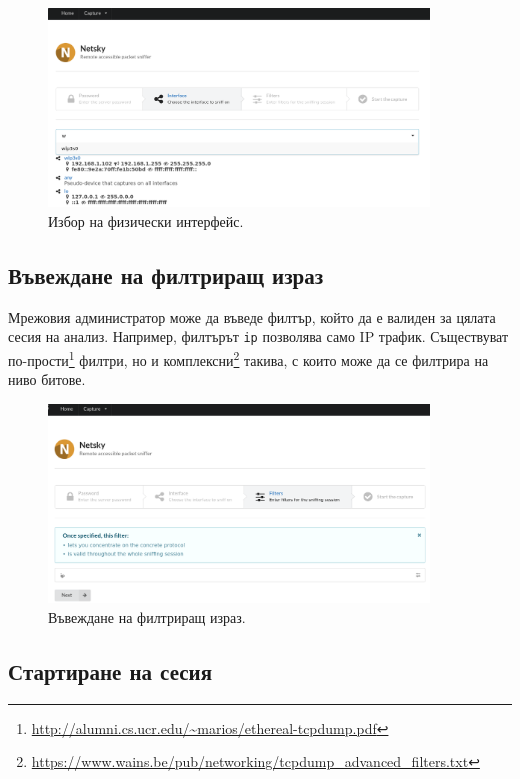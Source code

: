\documentclass[12pt,a4paper,oneside]{book}
\begin{document}
\begin{figure}[h!]
  \centering
  \includegraphics[width=0.9\textwidth]{figures/screenshots/interface.png}
  \caption{Избор на физически интерфейс.}
  \label{screenshots_interface_fig}
\end{figure}

\subsection{Въвеждане на филтриращ израз}

Мрежовия администратор може да въведе филтър, който да е валиден за цялата сесия
на анализ. Например, филтърът \texttt{ip} позволява само IP трафик. Съществуват
по-прости\footnote{\url{http://alumni.cs.ucr.edu/~marios/ethereal-tcpdump.pdf}}
филтри,
но и
комплексни\footnote{\url{https://www.wains.be/pub/networking/tcpdump_advanced_filters.txt}}
такива, с които може да се филтрира на ниво битове.

\begin{figure}[h!]
  \centering
  \includegraphics[width=0.9\textwidth]{figures/screenshots/filter.png}
  \caption{Въвеждане на филтриращ израз.}
  \label{screenshots_filter_fig}
\end{figure}

\subsection{Стартиране на сесия}
\end{document}
